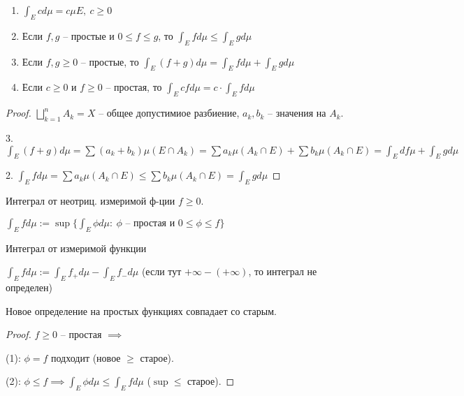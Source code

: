 \begin{properties}
    \begin{enumerate}
        \item {
            $\int_{E} c d \mu = c \mu E, \ c \geq 0$
        }
        \item {
            Если $f, g$ -- простые и $0 \leq f \leq g$, то $\int_{E} f d \mu \leq \int_E g d \mu$
        }
        \item {
            Если $f, g \geq 0$ -- простые, то $\int_{E} (f+g) d \mu = \int_{E} f d \mu + \int_{E} g d \mu$
        }
        \item {
            Если $c \geq 0$ и $ f \geq 0$ -- простая, то $\int_{E} c f d \mu = c \cdot \int_{E} f d \mu$
        }
    \end{enumerate}
\end{properties}
\begin{proof}

    $\bigsqcup_{k=1}^{n} A_k = X$ -- общее допустимиое разбиение, $a_k, b_k$ -- значения на $A_k$.


    3. $\int_{E} (f + g) d \mu = \sum (a_k + b_k) \mu (E \cap A_k) = \sum a_k \mu (A_k \cap E) + \sum b_k \mu (A_k \cap E) = \int_E d f \mu + \int_E g d \mu$
    
    2. $\int_E f d \mu = \sum a_k \mu (A_k \cap E) \leq \sum b_k \mu (A_k \cap E) = \int_E g d \mu$
\end{proof}

\begin{definition}
    Интеграл от неотриц. измеримой ф-ции $f \geq 0$.

    $\int_E f d \mu := \sup \{ \int_E \phi d \mu : \ \phi \text{ -- простая и } 0 \leq \phi \leq f \}$
\end{definition}

\begin{definition}
    Интеграл от измеримой функции

    $\int_E f d \mu := \int_E f_+ d \mu - \int_E f_- d \mu$ (если тут $+\infty - (+\infty)$, то интеграл не определен)
\end{definition}

\begin{remark}
    Новое определение на простых функциях совпадает со старым.

    \begin{proof}
        $f \geq 0$ -- простая $ \implies$
        
        (1): $\phi = f$ подходит (новое $\geq$ старое).
    
        (2): $\phi \leq f \implies \int_E \phi d \mu \leq \int_E f d \mu$ ($\sup \leq$ старое).
    \end{proof}
\end{remark}


